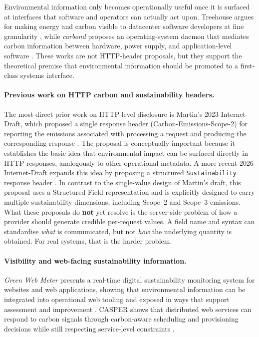 Environmental information only becomes operationally useful once it is surfaced at interfaces that software and operators can actually act upon. Treehouse argues for making energy and carbon visible to datacenter software developers at fine granularity \cite{anderson2023treehouse}, while \textit{carbond} proposes an operating-system daemon that mediates carbon information between hardware, power supply, and application-level software \cite{schmidt2024carbond}. These works are not HTTP-header proposals, but they support the theoretical premise that environmental information should be promoted to a first-class systems interface.

\paragraph{Previous work on HTTP carbon and sustainability headers.}
The most direct prior work on HTTP-level disclosure is Martin's 2023 Internet-Draft, which proposed a single response header (Carbon-Emissions-Scope-2) for reporting the emissions associated with processing a request and producing the corresponding response \cite{martin-http-carbon-emissions-scope-2-00}. The proposal is conceptually important because it establishes the basic idea that environmental impact can be surfaced directly in HTTP responses, analogously to other operational metadata. A more recent 2026 Internet-Draft expands this idea by proposing a structured \texttt{Sustainability} response header \cite{besleaga-green-sustainability-header-00}. In contrast to the single-value design of Martin's draft, this proposal uses a Structured Field representation and is explicitly designed to carry multiple sustainability dimensions, including Scope~2 and Scope~3 emissions.  What these proposals do \textbf{not} yet resolve is the server-side problem of how a provider should generate credible per-request values. A field name and syntax can standardise \emph{what} is communicated, but not \emph{how} the underlying quantity is obtained. For real systems, that is the harder problem.

\paragraph{Visibility and web-facing sustainability information.}
\textit{Green Web Meter} presents a real-time digital sustainability monitoring system for websites and web applications, showing that environmental information can be integrated into operational web tooling and exposed in ways that support assessment and improvement \cite{sala2024greenwebmeter}. CASPER shows that distributed web services can respond to carbon signals through carbon-aware scheduling and provisioning decisions while still respecting service-level constraints \cite{souza2023casper}.

